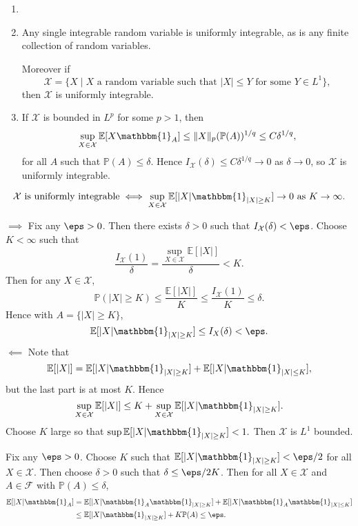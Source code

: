 \documentclass[12pt]{article}
\begin{document}
\begin{remark}
	\begin{enumerate}
		\item[]
		\item Any single integrable random variable is uniformly integrable, as is any finite collection of random variables.

			Moreover if
			\[
				\mathcal{X} = \{X \mid X \text{ a random variable such that } |X| \leq Y \text{ for some } Y \in L^1\},
			\]
			then $\mathcal{X}$ is uniformly integrable.
		\item If $\mathcal{X}$ is bounded in $L^p$ for some $p > 1$, then
			\[
			\sup_{X \in \mathcal{X}} \mathbb{E}[X \mathbbm{1}_{A}] \leq \|X\|_p (\mathbb{P}(A))^{1/q} \leq C \delta^{1/q},
			\]
			for all $A$ such that $\mathbb{P}(A) \leq \delta$. Hence $I_{\mathcal{X}}(\delta) \leq C \delta^{1/q} \to 0$ as $\delta \to 0$, so $\mathcal{X}$ is uniformly integrable.
	\end{enumerate}
\end{remark}


\begin{lemma}
	\[
		\mathcal{X} \text{ is uniformly integrable} \iff \sup_{X \in \mathcal{X}}\mathbb{E}[|X| \mathbbm{1}_{|X| \geq K}] \to 0 \text{ as } K \to \infty.
	\]
\end{lemma}

\begin{proofbox}
	$\implies$ Fix any $\eps > 0$. Then there exists $\delta > 0$ such that $I_{\mathcal{X}}(\delta) < \eps$. Choose $K < \infty$ such that
	\[
	\frac{I_{\mathcal{X}}(1)}{\delta} = \frac{\sup_{X \in \mathcal{X}} \mathbb{E}[|X|]}{\delta} < K.
	\]
	Then for any $X \in \mathcal{X}$,
	\[
	\mathbb{P}(|X| \geq K) \leq \frac{\mathbb{E}[|X|]}{K} \leq \frac{I_{\mathcal{X}}(1)}{K} \leq \delta.
	\]
	Hence with $A = \{|X| \geq K\}$,
	\[
	\mathbb{E}[|X|\mathbbm{1}_{|X| \geq K}] \leq I_X(\delta) < \eps.
	\]
	$\impliedby$ Note that
	\[
	\mathbb{E}[|X|] = \mathbb{E}[|X| \mathbbm{1}_{|X| \geq K}] + \mathbb{E}[|X| \mathbbm{1}_{|X| \leq K}],
	\]
	but the last part is at most $K$. Hence
	\[
	\sup_{X \in \mathcal{X}} \mathbb{E}[|X|] \leq K + \sup_{X \in \mathcal{X}} \mathbb{E}[|X| \mathbbm{1}_{|X| \geq K}].
	\]
	Choose $K$ large so that $\sup \mathbb{E}[|X| \mathbbm{1}_{|X| \geq K}] < 1.$ Then $\mathcal{X}$ is $L^1$ bounded.

	Fix any $\eps > 0$. Choose $K$ such that $\mathbb{E}[|X| \mathbbm{1}_{|X| \geq K}] < \eps / 2$ for all $X \in \mathcal{X}$. Then choose $\delta > 0$ such that $\delta \leq \eps /2K$. Then for all $X \in \mathcal{X}$ and $A \in \mathcal{F}$ with $\mathbb{P}(A) \leq \delta$,
	\begin{align*}
		\mathbb{E}[|X| \mathbbm{1}_{A}] &= \mathbb{E}[|X| \mathbbm{1}_{A} \mathbbm{1}_{|X| \geq K}] + \mathbb{E}[|X| \mathbbm{1}_{A} \mathbbm{1}_{|X| \leq K}] \\
						&\leq \mathbb{E}[|X| \mathbbm{1}_{|X| \geq K}] + K \mathbb{P}(A) \leq \eps.
	\end{align*}
\end{proofbox}
\end{document}
